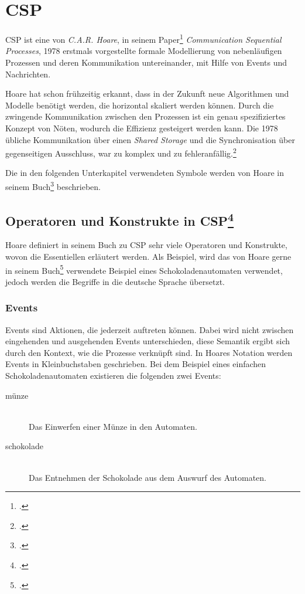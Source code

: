 \section{\acl{CSP}}
\acf{CSP} ist eine von \textit{C.A.R. Hoare}, in seinem Paper\footcite{CSP} \textit{Communication Sequential Processes}, 1978 erstmals vorgestellte formale Modellierung von nebenläufigen Prozessen und deren Kommunikation untereinander, mit Hilfe von Events und Nachrichten.

Hoare hat schon frühzeitig erkannt, dass in der Zukunft neue Algorithmen und Modelle benötigt werden, die horizontal skaliert werden können. Durch die zwingende Kommunikation zwischen den Prozessen ist ein genau spezifiziertes Konzept von Nöten, wodurch die Effizienz gesteigert werden kann. Die 1978 übliche Kommunikation über einen \textit{Shared Storage} und die Synchronisation über gegenseitigen Ausschluss, war zu komplex und zu fehleranfällig.\footcite[Introduction]{CSP}

Die in den folgenden Unterkapitel verwendeten Symbole werden von Hoare in seinem Buch\footcite[Glossary of Symbols]{CSPBOOK} beschrieben.

\subsection[Operatoren und Konstrukte in \acs{CSP}]{Operatoren und Konstrukte in \acs{CSP}\footcite[Siehe][Kap. 1.1]{CSPBOOK}}

Hoare definiert in seinem Buch zu \ac{CSP} sehr viele Operatoren und Konstrukte, wovon die Essentiellen  erläutert werden. Als Beispiel, wird das von Hoare gerne in seinem Buch\footcite{CSPBOOK} verwendete Beispiel eines Schokoladenautomaten verwendet, jedoch werden die Begriffe in die deutsche Sprache übersetzt.

\subsubsection{Events}
Events sind Aktionen, die jederzeit auftreten können. Dabei wird nicht zwischen eingehenden und ausgehenden Events unterschieden, diese Semantik ergibt sich durch den Kontext, wie die Prozesse verknüpft sind. In Hoares Notation werden Events in Kleinbuchstaben geschrieben.
Bei dem Beispiel eines einfachen Schokoladenautomaten existieren die folgenden zwei Events:

\begin{description}
\item[münze]\hfill \\
Das Einwerfen einer Münze in den Automaten.
\item[schokolade]\hfill \\
Das Entnehmen der Schokolade aus dem Auswurf des Automaten.
\end{description}

